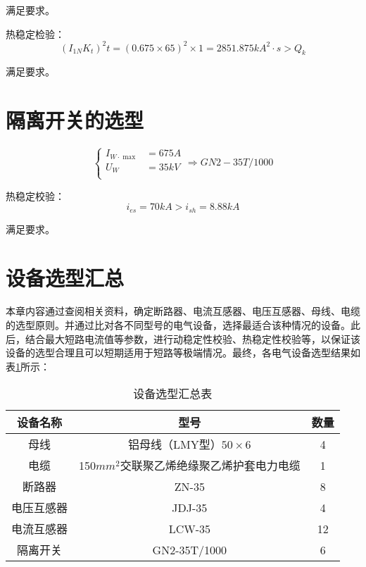 满足要求。

热稳定检验：
$$
\left( I_{1N}K_t \right) ^2t=\left( 0.675\times 65 \right) ^2\times 1=2851.875kA^2\cdot s>Q_k
$$

满足要求。
\section{隔离开关的选型}
$$
\begin{cases}
	I_{W\cdot \max}&=675A\\
	U_W&=35kV\\
\end{cases}\Longrightarrow GN2-35T/1000
$$

热稳定校验：
$$
i_{es}=70kA>i_{sh}=8.88kA
$$


满足要求。
\section{设备选型汇总}
本章内容通过查阅相关资料，确定断路器、电流互感器、电压互感器、母线、电缆的选型原则。并通过比对各不同型号的电气设备，选择最适合该种情况的设备。此后，结合最大短路电流值等参数，进行动稳定性校验、热稳定性校验等，以保证该设备的选型合理且可以短期适用于短路等极端情况。最终，各电气设备选型结果如表\ref{tab:设备选型汇总表}所示：
\begin{table}[ht]
	\caption{设备选型汇总表}
	\label{tab:设备选型汇总表}
	\renewcommand\arraystretch{2}
	\centering
	\begin{tabular}{|c|c|c|}
		\hline
		设备名称 & 型号 & 数量 \\ \hline
		\multirow{2}{*}{母线} & \multirow{2}{*}{铝母线（LMY型）$50\times 6$} & \multirow{2}{*}{4} \\
		&  &  \\ \hline
		电缆 & 150$mm^2$交联聚乙烯绝缘聚乙烯护套电力电缆 & 1 \\ \hline
		断路器 & ZN-35 & 8 \\ \hline
		电压互感器 & JDJ-35 & 4 \\ \hline
		电流互感器 & LCW-35 & 12 \\ \hline
		隔离开关 & GN2-35T/1000 & 6 \\ \hline
	\end{tabular}
\end{table}


